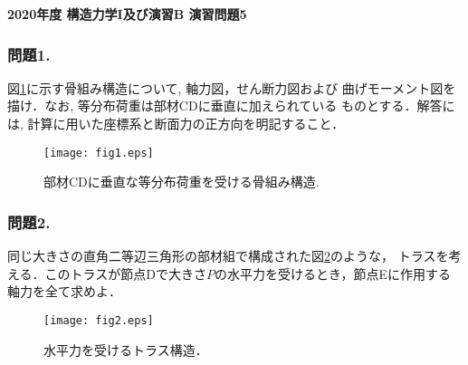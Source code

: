 \documentclass[10pt,a4j]{jarticle}
\newlength{\minitwocolumn}
\begin{document}
\newcommand{\fat}[1]{\mbox{\boldmath $#1$}}
\newcommand{\D}{\partial}
\newcommand{\w}{\omega}
\newcommand{\ga}{\alpha}
\newcommand{\gb}{\beta}
\newcommand{\gx}{\xi}
\newcommand{\gz}{\zeta}
\newcommand{\vhat}[1]{\hat{\fat{#1}}}
\newcommand{\spc}{\vspace{0.7\baselineskip}}
\newcommand{\halfspc}{\vspace{0.3\baselineskip}}

\pagestyle{empty}
\newcommand{\twofig}[2]
 {
   \begin{figure}[h]
     \begin{minipage}[t]{\minitwocolumn}
         \begin{center}   #1
         \end{center}
     \end{minipage}
         \hspace{\columnsep}
     \begin{minipage}[t]{\minitwocolumn}
         \begin{center} #2
         \end{center}
     \end{minipage}
   \end{figure}
 }
\begin{center}
{\Large \bf 2020年度 構造力学I及び演習B 演習問題5} \\
\end{center}
\subsubsection*{問題1.}
図\ref{fig:fig1}に示す骨組み構造について, 軸力図，せん断力図および
曲げモーメント図を描け．なお, 等分布荷重は部材CDに垂直に加えられている
ものとする．解答には, 計算に用いた座標系と断面力の正方向を明記すること．
\begin{figure}[h]
	\begin{center}
	\texttt{[image: fig1.eps]} 
	\end{center}
	\caption{部材CDに垂直な等分布荷重を受ける骨組み構造.}
	\label{fig:fig1}
\end{figure}
\subsubsection*{問題2.}
同じ大きさの直角二等辺三角形の部材組で構成された図\ref{fig:fig2}のような，
トラスを考える．このトラスが節点Dで大きさ$P$の水平力を受けるとき，節点Eに作用する軸力を全て求めよ．
\begin{figure}[h]
	\begin{center}
	\texttt{[image: fig2.eps]} 
	\end{center}
	\caption{水平力を受けるトラス構造．} 
	\label{fig:fig2}
\end{figure}
\end{document}
